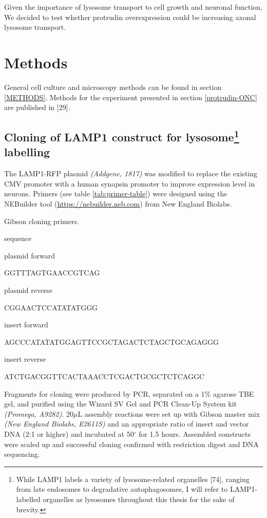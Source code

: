 \documentclass[
  12pt,
  a4paper,
]{book}
\begin{document}
Given the importance of lysosome transport to cell growth and neuronal function, We decided to test whether protrudin overexpression could be increasing axonal lysosome transport.

\hypertarget{methods}{%
\section{Methods}\label{methods}}

General cell culture and microscopy methods can be found in section \ref{METHODS}. Methods for the experiment presented in section \ref{protrudin-ONC} are published in {[}29{]}.

\hypertarget{cloning-of-lamp1-construct-for-lysosome-labelling}{%
\subsection[Cloning of LAMP1 construct for lysosome labelling]{\texorpdfstring{Cloning of LAMP1 construct for lysosome\footnote{While LAMP1 labels a variety of lysosome-related organelles {[}74{]}, ranging from late endosomes to degradative autophagosomes, I will refer to LAMP1-labelled organelles as lysosomes throughout this thesis for the sake of brevity.} labelling}{Cloning of LAMP1 construct for lysosome labelling}}\label{cloning-of-lamp1-construct-for-lysosome-labelling}}

The LAMP1-RFP plasmid \emph{(Addgene, 1817)} was modified to replace the existing CMV promoter with a human synapsin promoter to improve expression level in neurons. Primers (see table \ref{tab:primer-table}) were designed using the NEBuilder tool (\url{https://nebuilder.neb.com}) from New England Biolabs.

\label{tab:primer-table}Gibson cloning primers.

sequence

plasmid forward

GGTTTAGTGAACCGTCAG

plasmid reverse

CGGAACTCCATATATGGG

insert forward

AGCCCATATATGGAGTTCCGCTAGACTCTAGCTGCAGAGGG

insert reverse

ATCTGACGGTTCACTAAACCTCGACTGCGCTCTCAGGC

Fragments for cloning were produced by PCR, separated on a 1\% agarose TBE gel, and purified using the Wizard SV Gel and PCR Clean-Up System kit \emph{(Promega, A9282)}. 20\(\mu\)L assembly reactions were set up with Gibson master mix \emph{(New England Biolabs, E2611S)} and an appropriate ratio of insert and vector DNA (2:1 or higher) and incubated at 50\(^{\circ}\) for 1.5 hours. Assembled constructs were scaled up and successful cloning confirmed with restriction digest and DNA sequencing.
\end{document}
